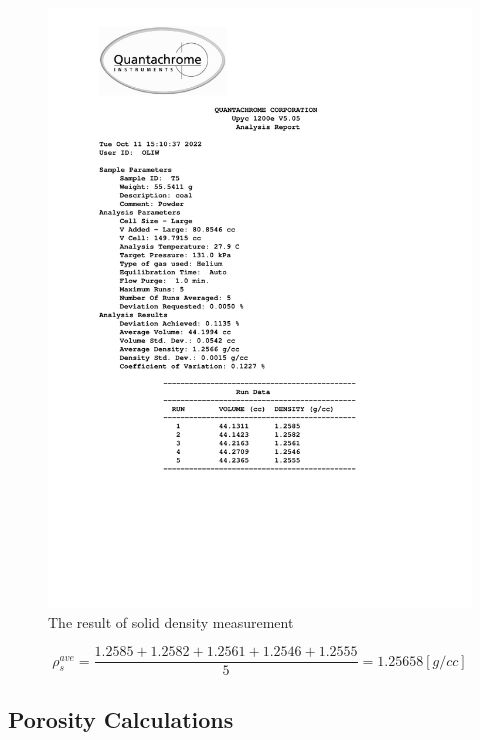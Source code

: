 \documentclass[a4paper,fleqn]{cas-dc}
\begin{document}
\begin{figure}[!h]
	\centering 
	\includegraphics[trim=2cm 6cm 4cm 0cm, clip,width=\columnwidth]{Sections/ultraReportT5.pdf}
	\caption{The result of solid density measurement}
\end{figure}

{\footnotesize
	\begin{equation*}
		\rho_s^{ave} = \frac{1.2585+1.2582+1.2561+1.2546+1.2555}{5} = 1.25658 [g/cc]
	\end{equation*}
}

\subsection{Porosity Calculations} \label{CH: Porosity}


%
\end{document}

